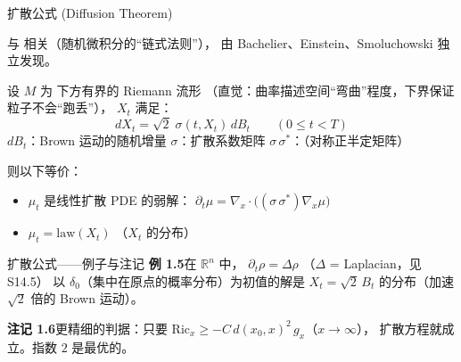 \documentclass[aspectratio=169,10pt]{beamer}
\begin{document}
\begin{frame}{扩散公式 (Diffusion Theorem)}
  \begin{TLtext}
    与  相关（随机微积分的``链式法则''），
    由 Bachelier、Einstein、Smoluchowski 独立发现。
  \end{TLtext}

  \vspace{0.3em}
  设 $M$ 为 下方有界的 Riemann 流形
  \;（直觉：曲率描述空间``弯曲''程度，下界保证粒子不会``跑丢''），
  $X_t$ 满足：
  \[
    dX_t = \sqrt{2}\;\sigma(t,X_t)\,dB_t
    \qquad (0\le t<T)
  \]
  {\small $dB_t$：Brown 运动的随机增量 \quad
    $\sigma$：扩散系数矩阵 \quad
    $\sigma\,\sigma^*$：（对称正半定矩阵）}

  \vspace{0.3em}
  则以下等价：
  \begin{itemize}
    \item[\textbf{(i)}] $\mu_t$ 是线性扩散 PDE 的弱解：
      $\displaystyle\partial_t\mu = \nabla_x\cdot\bigl((\sigma\,\sigma^*)\nabla_x\mu\bigr)$
    \item[\textbf{(ii)}] $\mu_t = \mathrm{law}(X_t)$
      \;（$X_t$ 的分布）
  \end{itemize}
\end{frame}

\begin{frame}{扩散公式——例子与注记}
  \textbf{例 1.5}\enspace 在 $\mathbb{R}^n$ 中，
  $\partial_t\rho=\Delta\rho$
  \;（$\Delta$ = Laplacian，见 S14.5）
  以 $\delta_0$（集中在原点的概率分布）为初值的解是
  $X_t=\sqrt{2}\,B_t$ 的分布（加速 $\sqrt{2}$ 倍的 Brown 运动）。

  \medskip
  \textbf{注记 1.6}\enspace 更精细的判据：只要 $\mathrm{Ric}_x\ge -C\,d(x_0,x)^2\,g_x$（$x\to\infty$），
  扩散方程就成立。指数 $2$ 是最优的。

  \vspace{0.3em}
\end{frame}

\end{document}
